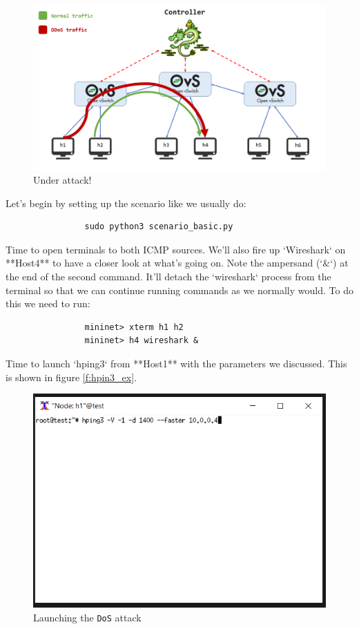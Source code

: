 \documentclass[12pt]{report}
\begin{document}
			\begin{figure}
				\centering
				\includegraphics[scale = 1]{scenario_ddos.png}
				\caption{Under attack!}
				\label{f:dos_atk}
			\end{figure}

			Let's begin by setting up the scenario like we usually do:

			\begin{verbatim}
				sudo python3 scenario_basic.py
			\end{verbatim}

			Time to open terminals to both ICMP sources. We'll also fire up `Wireshark` on **Host4** to have a closer look at what's going on. Note the ampersand (`&`) at the end of the second command. It'll detach the `wireshark` process from the terminal so that we can continue running commands as we normally would. To do this we need to run:

			\begin{verbatim}
				mininet> xterm h1 h2
				mininet> h4 wireshark &
			\end{verbatim}

			Time to launch `hping3` from **Host1** with the parameters we discussed. This is shown in figure \ref{f:hpin3_ex}.

			\begin{figure}
				\centering
				\includegraphics[scale = 1]{launch_hping3.png}
				\caption{Launching the \texttt{DoS} attack}
				\label{f:hping3_ex}
			\end{figure}
\end{document}
